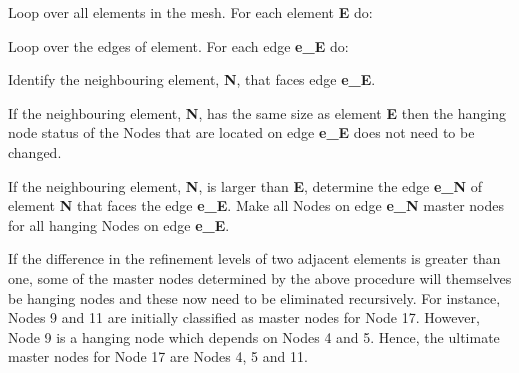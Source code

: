\begin{DoxyItemize}
\item Loop over all elements in the mesh. For each element {\bfseries E} do\+:
\begin{DoxyItemize}
\item Loop over the edges of element. For each edge {\bfseries e\+\_\+E} do\+:
\begin{DoxyItemize}
\item Identify the neighbouring element, {\bfseries N}, that faces edge {\bfseries e\+\_\+E}.
\item If the neighbouring element, {\bfseries N}, has the same size as element {\bfseries E} then the hanging node status of the {\ttfamily Nodes} that are located on edge {\bfseries e\+\_\+E} does not need to be changed.
\item If the neighbouring element, {\bfseries N}, is larger than {\bfseries E}, determine the edge {\bfseries e\+\_\+N} of element {\bfseries N} that faces the edge {\bfseries e\+\_\+E}. Make all {\ttfamily Nodes} on edge {\bfseries e\+\_\+N} master nodes for all hanging {\ttfamily Nodes} on edge {\bfseries e\+\_\+E}.
\end{DoxyItemize}
\end{DoxyItemize}
\end{DoxyItemize}If the difference in the refinement levels of two adjacent elements is greater than one, some of the master nodes determined by the above procedure will themselves be hanging nodes and these now need to be eliminated recursively. For instance, {\ttfamily Nodes} 9 and 11 are initially classified as master nodes for {\ttfamily Node} 17. However, {\ttfamily Node} 9 is a hanging node which depends on {\ttfamily Nodes} 4 and 5. Hence, the ultimate master nodes for {\ttfamily Node} 17 are {\ttfamily Nodes} 4, 5 and 11.

